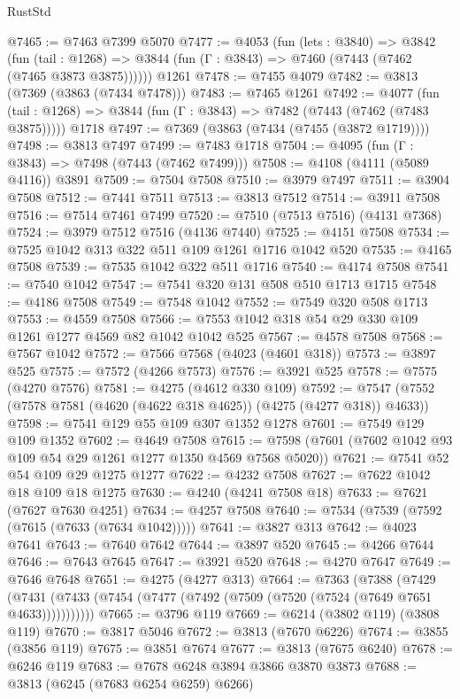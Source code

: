 \begin{lexlean}{RustStd}
\begin{coremodule}
{\begin{coremodule}
{{{{{{{{{{{{{{{{{{{{{{{{{{{{{{{{{{{@7465 := @7463 @7399 @5070
@7477 := @4053
    (fun (lets : @3840) =>
    @3842
      (fun (tail : @1268) => @3844 (fun (Γ : @3843) => @7460 (@7443 (@7462 (@7465 @3873 @3875))))))
    @1261
@7478 := @7455 @4079
@7482 := @3813 (@7369 (@3863 (@7434 @7478)))
@7483 := @7465 @1261
@7492 := @4077
    (fun (tail : @1268) => @3844 (fun (Γ : @3843) => @7482 (@7443 (@7462 (@7483 @3875)))))
    @1718
@7497 := @7369 (@3863 (@7434 (@7455 (@3872 @1719))))
@7498 := @3813 @7497
@7499 := @7483 @1718
@7504 := @4095 (fun (Γ : @3843) => @7498 (@7443 (@7462 @7499)))
@7508 := @4108 (@4111 (@5089 @4116)) @3891
@7509 := @7504 @7508
@7510 := @3979 @7497
@7511 := @3904 @7508
@7512 := @7441 @7511
@7513 := @3813 @7512
@7514 := @3911 @7508
@7516 := @7514 @7461 @7499
@7520 := @7510 (@7513 @7516) (@4131 @7368)
@7524 := @3979 @7512 @7516 (@4136 @7440)
@7525 := @4151 @7508
@7534 := @7525 @1042 @313 @322 @511 @109 @1261 @1716 @1042 @520
@7535 := @4165 @7508
@7539 := @7535 @1042 @322 @511 @1716
@7540 := @4174 @7508
@7541 := @7540 @1042
@7547 := @7541 @320 @131 @508 @510 @1713 @1715
@7548 := @4186 @7508
@7549 := @7548 @1042
@7552 := @7549 @320 @508 @1713
@7553 := @4559 @7508
@7566 := @7553 @1042 @318 @54 @29 @330 @109 @1261 @1277 @4569 @82 @1042 @1042 @525
@7567 := @4578 @7508
@7568 := @7567 @1042
@7572 := @7566 @7568 (@4023 (@4601 @318))
@7573 := @3897 @525
@7575 := @7572 (@4266 @7573)
@7576 := @3921 @525
@7578 := @7575 (@4270 @7576)
@7581 := @4275 (@4612 @330 @109)
@7592 := @7547 (@7552 (@7578 @7581 (@4620 (@4622 @318 @4625)) (@4275 (@4277 @318)) @4633))
@7598 := @7541 @129 @55 @109 @307 @1352 @1278
@7601 := @7549 @129 @109 @1352
@7602 := @4649 @7508
@7615 := @7598 (@7601 (@7602 @1042 @93 @109 @54 @29 @1261 @1277 @1350 @4569 @7568 @5020))
@7621 := @7541 @52 @54 @109 @29 @1275 @1277
@7622 := @4232 @7508
@7627 := @7622 @1042 @18 @109 @18 @1275
@7630 := @4240 (@4241 @7508 @18)
@7633 := @7621 (@7627 @7630 @4251)
@7634 := @4257 @7508
@7640 := @7534 (@7539 (@7592 (@7615 (@7633 (@7634 @1042)))))
@7641 := @3827 @313
@7642 := @4023 @7641
@7643 := @7640 @7642
@7644 := @3897 @520
@7645 := @4266 @7644
@7646 := @7643 @7645
@7647 := @3921 @520
@7648 := @4270 @7647
@7649 := @7646 @7648
@7651 := @4275 (@4277 @313)
@7664 := @7363
    (@7388
      (@7429 (@7431 (@7433 (@7454 (@7477 (@7492 (@7509 (@7520 (@7524 (@7649 @7651 @4633)))))))))))
@7665 := @3796 @119
@7669 := @6214 (@3802 @119) (@3808 @119)
@7670 := @3817 @5046
@7672 := @3813 (@7670 @6226)
@7674 := @3855 (@3856 @119)
@7675 := @3851 @7674
@7677 := @3813 (@7675 @6240)
@7678 := @6246 @119
@7683 := @7678 @6248 @3894 @3866 @3870 @3873
@7688 := @3813 (@6245 (@7683 @6254 @6259) @6266)
}}}}}}}}}}}}}}}}}}}}}}}}}}}}}}}}}}}
\end{coremodule}}
\end{coremodule}
\end{lexlean}

